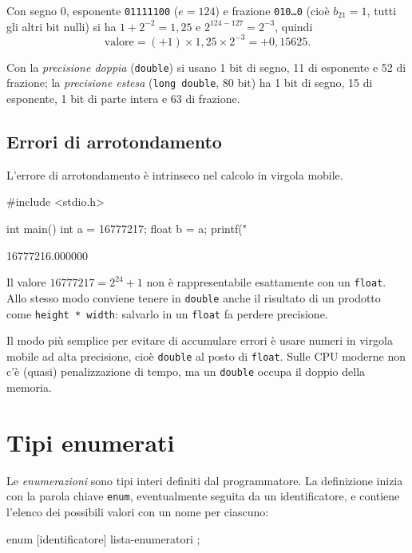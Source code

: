 \documentclass[11pt,a4paper]{article}
\begin{document}
\begin{esempio}
Con segno $0$, esponente \texttt{01111100} ($e = 124$) e frazione
\texttt{010\dots0} (cioè $b_{21} = 1$, tutti gli altri bit nulli) si ha
$1 + 2^{-2} = 1{,}25$ e $2^{124 - 127} = 2^{-3}$, quindi
\[
  \text{valore} = (+1) \times 1{,}25 \times 2^{-3} = +0{,}15625 .
\]
\end{esempio}

Con la \emph{precisione doppia} (\lstinline|double|) si usano 1 bit di segno,
11 di esponente e 52 di frazione; la \emph{precisione estesa}
(\lstinline|long double|, 80 bit) ha 1 bit di segno, 15 di esponente, 1 bit di
parte intera e 63 di frazione.

\subsection{Errori di arrotondamento}

L'errore di arrotondamento è intrinseco nel calcolo in virgola mobile.

\begin{codice}
#include <stdio.h>

int main() {
    int a = 16777217;
    float b = a;
    printf("%
}
\end{codice}
\begin{risultato}
16777216.000000
\end{risultato}

Il valore $16777217 = 2^{24} + 1$ non è rappresentabile esattamente con un
\lstinline|float|. Allo stesso modo conviene tenere in \lstinline|double| anche
il risultato di un prodotto come \lstinline|height * width|: salvarlo in un
\lstinline|float| fa perdere precisione.

\begin{osservazione}
Il modo più semplice per evitare di accumulare errori è usare numeri in virgola
mobile ad alta precisione, cioè \lstinline|double| al posto di \lstinline|float|.
Sulle CPU moderne non c'è (quasi) penalizzazione di tempo, ma un \lstinline|double|
occupa il doppio della memoria.
\end{osservazione}

\section{Tipi enumerati}

Le \emph{enumerazioni} sono tipi interi definiti dal programmatore. La definizione
inizia con la parola chiave \lstinline|enum|, eventualmente seguita da un
identificatore, e contiene l'elenco dei possibili valori con un nome per ciascuno:
\begin{codice}
enum [identificatore] { lista-enumeratori };
\end{codice}
\end{document}
